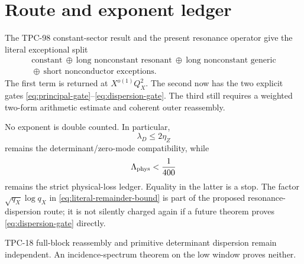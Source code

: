 \section{Route and exponent ledger}
\label{sec:route-ledger}

The TPC-98 constant-sector result and the present resonance operator
give the literal exceptional split
\[
 \begin{gathered}
 \text{constant}
 \ \oplus\
 \text{long nonconstant resonant}
 \ \oplus\
 \text{long nonconstant generic}
 \\[-1mm]
 {}\oplus\
 \text{short nonconductor exceptions}.
 \end{gathered}
\]
The first term is returned at \(X^{o(1)}Q_X^2\).  The second now has
the two explicit gates
\eqref{eq:principal-gate}--\eqref{eq:dispersion-gate}.  The third
still requires a weighted two-form arithmetic estimate and coherent
outer reassembly.

No exponent is double counted.  In particular,
\[
 \lambda_D\le2\eta_Z
\]
remains the determinant/zero-mode compatibility, while
\[
 \Lambda_{\rm phys}<\frac1{400}
\]
remains the strict physical-loss ledger.  Equality in the latter is
a stop.  The factor \(\sqrt{q_X}\log q_X\) in
\eqref{eq:literal-remainder-bound} is part of the proposed
resonance-dispersion route; it is not silently charged again if a
future theorem proves \eqref{eq:dispersion-gate} directly.

TPC-18 full-block reassembly and primitive determinant dispersion
remain independent.  An incidence-spectrum theorem on the low
window proves neither.
